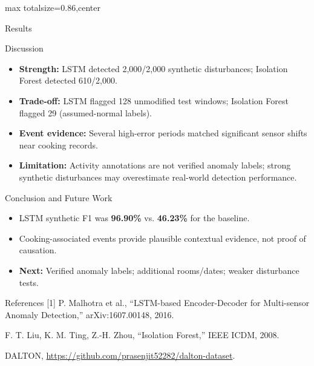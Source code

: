 \documentclass[12pt,a3paper]{article}
\begin{document}
\begin{adjustbox}{max totalsize={\textwidth}{0.86\textheight},center}
\begin{minipage}{\textwidth}
\begin{minipage}[t]{0.485\linewidth}
\begin{posterblock}{Results}
\end{posterblock}
\begin{posterblock}{Discussion}
\begin{itemize}
\item \textbf{Strength:} LSTM detected 2,000/2,000 synthetic disturbances; Isolation Forest detected 610/2,000.
\item \textbf{Trade-off:} LSTM flagged 128 unmodified test windows; Isolation Forest flagged 29 (assumed-normal labels).
\item \textbf{Event evidence:} Several high-error periods matched significant sensor shifts near cooking records.
\item \textbf{Limitation:}
Activity annotations are not verified anomaly
labels; strong synthetic disturbances may
overestimate real-world detection performance.
\end{itemize}
\end{posterblock}
\begin{posterblock}{Conclusion and Future Work}
\begin{itemize}
\item LSTM synthetic F1 was \textbf{96.90\%} vs. \textbf{46.23\%} for the baseline.
\item Cooking-associated events provide plausible contextual evidence, not proof of causation.
\item \textbf{Next:} Verified anomaly labels; additional rooms/dates; weaker disturbance tests.
\end{itemize}
\end{posterblock}
\begin{minipage}[t]{0.64\linewidth}\vspace{0pt}
\begin{posterblock}{References}
\scriptsize
[1] P. Malhotra et al., ``LSTM-based Encoder-Decoder for Multi-sensor Anomaly Detection,'' arXiv:1607.00148, 2016.\par
[2] F. T. Liu, K. M. Ting, Z.-H. Zhou, ``Isolation Forest,'' IEEE ICDM, 2008.\par
[3] DALTON, \url{https://github.com/prasenjit52282/dalton-dataset}.
\end{posterblock}
\end{minipage}%
\hfill%
\begin{minipage}[t]{0.34\linewidth}\vspace{0pt}




\end{minipage}
\end{minipage}
\end{minipage}
\end{adjustbox}
\end{document}
